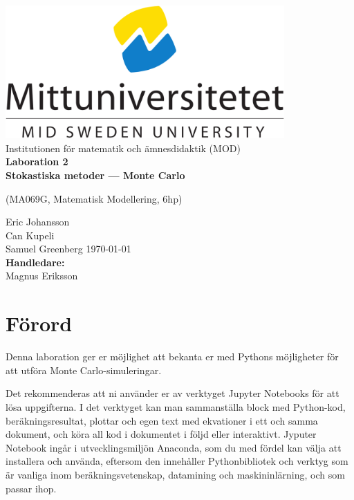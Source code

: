 \documentclass[a4paper]{article}
\newcommand{\getauthor}{Eric Johansson\\
                        Can Kupeli\\
                        Samuel Greenberg} %
\newcommand{\gettitle}{Laboration 2 \\ Stokastiska metoder --- Monte Carlo} %
\newcommand{\getcourse}{(MA069G, Matematisk Modellering, 6hp)} %
\newcommand{\getsupervisor}{Magnus Eriksson}
\begin{document}
\begin{titlepage}
    \begin{center}
        \vspace*{1cm}
        \includegraphics[width=0.8\textwidth]{msu.png}\\[0.5cm]
        \Large
        Institutionen för matematik och ämnesdidaktik (MOD)\\[1cm]
        \Huge
        \textbf{\gettitle}

        \large
        \getcourse{}

        \vspace{1cm}
        \getauthor{}
        \Large
        \vfill
        \vspace{0.8cm}
        \small
        \today \\
        \Large
        \textbf{Handledare:}\\
        \getsupervisor{}
    \end{center}
\end{titlepage}

\tableofcontents
\newpage

\section{Förord}
Denna laboration ger er möjlighet att bekanta er med Pythons
möjligheter för att utföra Monte Carlo-simuleringar.

Det rekommenderas att ni använder er av verktyget Jupyter Notebooks för att lösa
uppgifterna. I det verktyget kan man sammanställa block med Python-kod, beräkningsresultat,
plottar och egen text med ekvationer i ett och samma dokument, och köra all kod i dokumentet
i följd eller interaktivt. Jyputer Notebook ingår i utvecklingsmiljön Anaconda, som du med
fördel kan välja att installera och använda, eftersom den innehåller Pythonbibliotek och
verktyg som är vanliga inom beräkningsvetenskap, datamining och maskininlärning, och som passar ihop.
\end{document}
